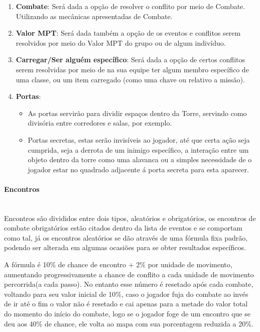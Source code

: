\documentclass[11pt]{article} %
\begin{document}
\begin{enumerate}
  \item \textbf{Combate}: Será dada a opção de resolver o conflito por meio de Combate. Utilizando as mecânicas apresentadas de Combate.
  \item \textbf{Valor MPT}: Será dada também a opção de os eventos e conflitos serem resolvidos por meio do Valor MPT do grupo ou de algum indivíduo.
  \item \textbf{Carregar/Ser alguém específico}: Será dada a opção de certos conflitos serem resolvidas por meio de na sua equipe ter algum membro específico de uma classe, ou um item carregado (como uma chave ou relativo a missão).
  \item \textbf{Portas}:
  \begin{itemize}
    \item As portas servirão para dividir espaços dentro da Torre, servindo como divisória entre corredores e salas, por exemplo.
    \item Portas secretas, estas serão invisíveis ao jogador, até que certa ação seja cumprida, seja a derrota de um inimigo específico, a interação entre um objeto dentro da torre como uma alavanca ou a simples necessidade de o jogador estar no quadrado adjacente á porta secreta para esta aparecer.
    \end{itemize}
\end{enumerate}

\paragraph{Encontros} \mbox{}\\
Encontros são divididos entre dois tipos, aleatórios e obrigatórios, os encontros de combate obrigatórios estão citados dentro da lista de eventos e se comportam como tal, já os encontros aleatórios se dão através de uma fórmula fixa padrão, podendo ser alterada em algumas ocasiões para se obter resultados específicos.

A fórmula é 10\% de chance de encontro + 2\% por unidade de movimento, aumentando progressivamente a chance de conflito a cada unidade de movimento percorrida(a cada passo). No entanto esse número é resetado após cada combate, voltando para seu valor inicial de 10\%, caso o jogador fuja do combate ao invés de ir até o fim o valor não é resetado e cai apenas para a metade do valor total do momento do início do combate, logo se o jogador foge de um encontro que se deu aos 40\% de chance, ele volta ao mapa com sua porcentagem reduzida a 20\%.
\end{document}

